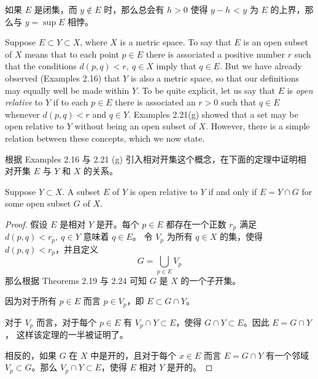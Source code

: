 \documentclass[../poma-notes.tex]{subfiles}
\begin{document}
\anote 如果 $E$ 是闭集，而 $y \notin E$ 时，那么总会有 $h>0$ 使得 $y-h$ < $y$ 为 $E$ 的上界，那么与 $y = \sup E$ 相悖。

\begin{remark}
  Suppose $E \subset Y \subset X$, where $X$ is a metric space. To say that $E$ is an open subset of $X$ means that to
  each point $p \in E$ there is associated a positive number $r$ such that the conditions $d(p,q)<r,\ q \in X$ imply
  that $q \in E$. But we have already observed (Examples 2.16) that $Y$ is also a metric space, so that our definitions
  may equally well be made within $Y$. To be quite explicit, let us say that $E$ is \textit{open relative} to $Y$ if to
  each $p \in E$ there is associated an $r>0$ such that $q \in E$ whenever $d(p,q)<r$ and $q \in Y$. Examples 2.21(g)
  showed that a set may be open relative to $Y$ without being an open subset of $X$. However, there is a simple relation
  between these concepts, which we now state.
\end{remark}

\anote
根据 Examples 2.16 与 2.21 (g) 引入相对开集这个概念，在下面的定理中证明相对开集 $E$ 与 $Y$ 和 $X$ 的关系。

\begin{theorem}
  Suppose $Y \subset X$. A subset $E$ of $Y$ is open relative to $Y$ if and only if $E = Y \cap G$ for some open
  subset $G$ of $X$.
\end{theorem}

\begin{proof}
  假设 $E$ 是相对 $Y$ 是开。每个 $p \in E$ 都存在一个正数 $r_p$ 满足 $d(p,q)<r_p,\ q \in Y$ 意味着 $q \in E$。
  令 $V_p$ 为所有 $q \in X$ 的集，使得 $d(p,q)<r_p$，并且定义
  \[G = \bigcup\limits_{p \in E} V_p\]
  那么根据 Theorems 2.19 与 2.24 可知 $G$ 是 $X$ 的一个子开集。

  因为对于所有 $p \in E$ 而言 $p \in V_p$，即 $E \subset G \cap Y$。

  对于 $V_p$ 而言，对于每个 $p \in E$ 有 $V_p \cap Y \subset E$，使得 $G \cap Y \subset E$。因此 $E = G \cap Y$，
  这样该定理的一半被证明了。

  相反的，如果 $G$ 在 $X$ 中是开的，且对于每个 $x \in E$ 而言 $E = G \cap Y$ 有一个邻域 $V_p \subset G$。那么
  $V_p \cap Y \subset E$，使得 $E$ 相对 $Y$ 是开的。
\end{proof}
\end{document}

